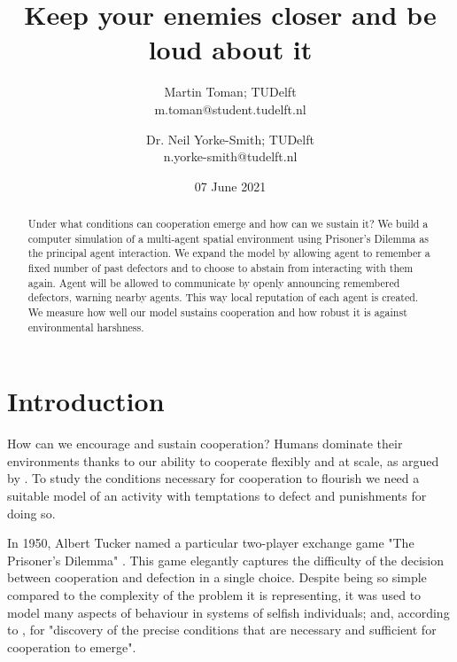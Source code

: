 \documentclass[english]{article}
\begin{document}
\listoftodos

\title{Keep your enemies closer and be loud about it}
\author{
  Martin Toman; TUDelft
  \\
  m.toman@student.tudelft.nl
\and
  Dr. Neil Yorke-Smith; TUDelft
  \\
  n.yorke-smith@tudelft.nl
}
\date{07 June 2021}
\maketitle


\begin{abstract}

Under what conditions can cooperation emerge and how can we sustain it?
We build a computer simulation of a multi-agent spatial environment using Prisoner's Dilemma as the principal agent interaction.
We expand the model by allowing agent to remember a fixed number of past defectors and to choose to abstain from interacting with them again.
Agent will be allowed to communicate by openly announcing remembered defectors, warning nearby agents.
This way local reputation of each agent is created.
We measure how well our model sustains cooperation and how robust it is against environmental harshness.

\end{abstract}



\section{Introduction}

How can we encourage and sustain cooperation? Humans dominate their environments thanks to our ability to cooperate flexibly and at scale, as argued by \citet{harari-sapiens}.
To study the conditions necessary for cooperation to flourish we need a suitable model of an activity with temptations to defect and punishments for doing so.

In 1950, Albert Tucker named a particular two-player exchange game "The Prisoner's Dilemma" \citep{sep-prisoner-dilemma}.
This game elegantly captures the difficulty of the decision between cooperation and defection in a single choice.
Despite being so simple compared to the complexity of the problem it is representing, it was used to model many aspects of behaviour in systems of selfish individuals; and, according to \citet{Axelrod84}, for "discovery of the precise conditions that are necessary and sufficient for cooperation to emerge".
\end{document}
